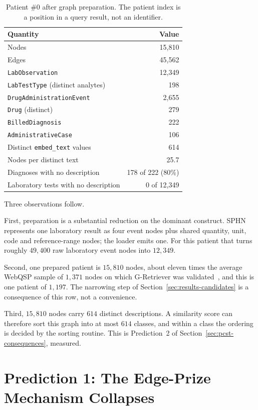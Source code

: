 \begin{table}[t]
\centering
\caption{Patient \#0 after graph preparation. The patient index is a position in
a query result, not an identifier.}
\label{tab:patient-zero}
\begin{tabular}{lr}
\toprule
Quantity & Value \\
\midrule
Nodes & 15{,}810 \\
Edges & 45{,}562 \\
\midrule
\texttt{LabObservation} & 12{,}349 \\
\texttt{LabTestType} (distinct analytes) & 198 \\
\texttt{DrugAdministrationEvent} & 2{,}655 \\
\texttt{Drug} (distinct) & 279 \\
\texttt{BilledDiagnosis} & 222 \\
\texttt{AdministrativeCase} & 106 \\
\midrule
Distinct \texttt{embed\_text} values & 614 \\
Nodes per distinct text & 25.7 \\
Diagnoses with no description & 178 of 222 (80\%) \\
Laboratory tests with no description & 0 of 12{,}349 \\
\bottomrule
\end{tabular}
\end{table}

Three observations follow.

First, preparation is a substantial reduction on the dominant construct. SPHN
represents one laboratory result as four event nodes plus shared quantity, unit,
code and reference-range nodes; the loader emits one. For this patient that turns
roughly $49{,}400$ raw laboratory event nodes into $12{,}349$.

Second, one prepared patient is $15{,}810$ nodes, about eleven times the average
WebQSP sample of $1{,}371$ nodes on which G-Retriever was
validated~\cite{he2024gretriever}, and this is one patient of $1{,}197$. The
narrowing step of Section~\ref{sec:results-candidates} is a consequence of this
row, not a convenience.

Third, $15{,}810$ nodes carry $614$ distinct descriptions. A similarity score can
therefore sort this graph into at most $614$ classes, and within a class the
ordering is decided by the sorting routine. This is Prediction~2 of
Section~\ref{sec:pcst-consequences}, measured.

\section{Prediction 1: The Edge-Prize Mechanism Collapses} \label{sec:results-dilution}

